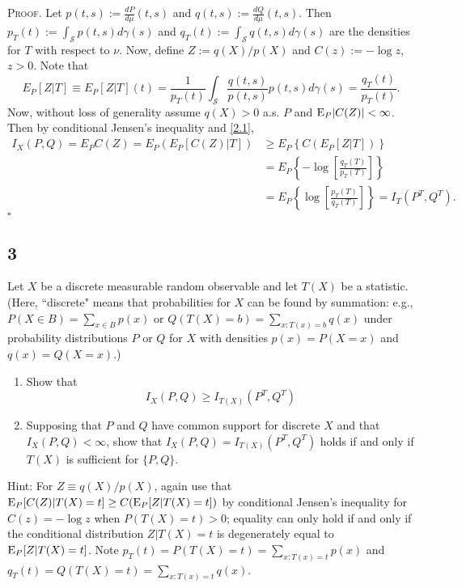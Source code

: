 \documentclass[12pt]{article}
\newcounter{ProofCounter}
\newenvironment{Proof}{\stepcounter{ProofCounter}\textsc{Proof.}}{\hfill$\square$}
\begin{document}
\begin{Proof}
  Let $p(t,s):=\frac{d P}{d \mu}(t,s)$ and $q(t,s) := \frac{d Q}{d \mu}(t,s)$. Then
  $p_{T}(t) := \int_{\mathcal{S}}p(t,s)d\gamma(s)$ and $q_{T}(t) := \int_{\mathcal{S}}q(t,s)d\gamma(s)$ are the densities for $T$ with respect to
  $\nu$. Now, define $Z := q(X) / p(X)$ and $C(z) := -\log z$, $z > 0$. Note that 
  \begin{equation}
    E_{P}[Z|T] \equiv E_P[Z|T](t) = \frac{1}{p_{T}(t)}\int_{\mathcal{S}}\frac{q(t,s)}{p(t,s)}p(t,s)d\gamma(s) = \frac{q_T(t)}{p_T(t)}.
      \label{2.1}
  \end{equation}
  Now, without loss of generality assume $q(X) > 0$ a.s. $P$ and $\mathrm{E}_P|C(Z)| < \infty$. Then by conditional Jensen's inequality and \eqref{2.1},
  \begin{align*}
    I_X(P,Q) = E_PC(Z) = E_P\left( E_P[C(Z)|T] \right) & \geq E_P\left\{ C\left( E_P[Z|T] \right) \right\} \\
    & = E_P\left\{ -\log\left[ \frac{q_T(T)}{p_T(T)} \right] \right\} \\
    & = E_P\left\{ \log\left[\frac{p_T(T)}{q_T(T)}\right] \right\} = I_T(P^{T},Q^{T}).
  \end{align*}
\end{Proof}

 
 
\newpage
\subsection*{3}
\begin{tcolorbox}
  Let $X$ be a discrete measurable random observable and let $T(X)$ be a statistic.  (Here, ``discrete" means that probabilities for $X$ can be found by summation:  e.g., $P(X \in B) = \sum_{x \in B} p(x)  $ or $Q(T(X)=b) = \sum_{x: T(x)=b} q(x)$ under probability distributions $P$ or $Q$ for $X$ with densities $p(x)=P(X=x)$ and $q(x)=Q(X=x)$.)
  \begin{enumerate}
    \item Show that \[
        I_X(P,Q) \geq I_{T(X)}(P^T,Q^T)
      \]

    \item Supposing that $P$ and $Q$ have common support for discrete $X$ and that $I_X(P,Q)<\infty$,  show that  $I_X(P,Q) = I_{T(X)}(P^T,Q^T)$ holds if and only if $T(X)$ is sufficient for $\{P,Q\}$.
  \end{enumerate}

  Hint:  For $Z\equiv  q(X)/p(X)$, again use that $\mathrm{E}_{P}[ C(Z) |T(X)=t] \geq C(\mathrm{E}_{P}[ Z |T(X)=t])$ by conditional Jensen's inequality for $C(z)= - \log z $ when $P(T(X)=t)>0$; equality can only hold if and only if the conditional distribution $Z|T(X)=t$ is degenerately equal to $\mathrm{E}_{P}[ Z |T(X)=t]$.     Note $p_T(t) = P(T(X)=t) = \sum_{x : T(x)=t} p(x)$ and $q_T(t) = Q(T(X)=t) = \sum_{x : T(x)=t} q(x)$.
\end{tcolorbox}
\end{document}
